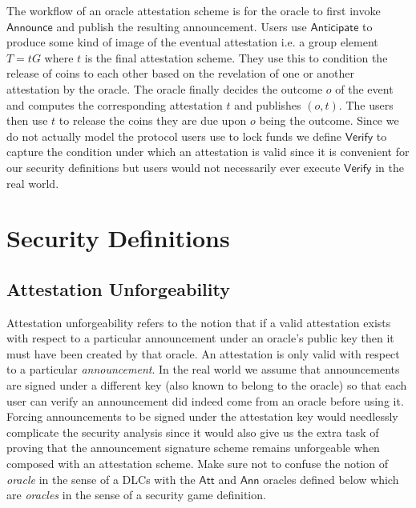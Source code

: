 \documentclass[runningheads]{llncs}
\newcommand{\Verify}{\mathsf{Verify}}
\newcommand{\Announce}{\mathsf{Announce}}
\newcommand{\AnnO}{\mathsf{Ann}}
\newcommand{\AttO}{\mathsf{Att}}
\newcommand{\Anticipate}{\mathsf{Anticipate}}
\newcommand{\att}{t}
\newcommand{\Att}{T}
\begin{document}
The workflow of an oracle attestation scheme is for the oracle to first invoke $\Announce$ and publish the resulting announcement.
Users use $\Anticipate$ to produce some kind of image of the eventual attestation i.e. a group element $\Att = \att{}G$ where $\att$ is the final attestation scheme.
They use this to condition the release of coins to each other based on the revelation of one or another attestation by the oracle.
The oracle finally decides the outcome $o$ of the event and computes the corresponding attestation $\att$ and publishes $(o,\att)$.
The users then use $\att$ to release the coins they are due upon $o$ being the outcome.
Since we do not actually model the protocol users use to lock funds we define $\Verify$ to capture the condition under which an attestation is valid since it is convenient for our security definitions but users would not necessarily ever execute $\Verify$ in the real world.

\section{Security Definitions}

\subsection{Attestation Unforgeability}

Attestation unforgeability refers to the notion that if a valid attestation exists with respect to a particular announcement under an oracle's public key then it must have been created by that oracle.
An attestation is only valid with respect to a particular \emph{announcement}.
In the real world we assume that announcements are signed under a different key (also known to belong to the oracle) so that each user can verify an announcement did indeed come from an oracle before using it.
Forcing announcements to be signed under the attestation key would needlessly complicate the security analysis since it would also give us the extra task of proving that the announcement signature scheme remains unforgeable when composed with an attestation scheme.
Make sure not to confuse the notion of \emph{oracle} in the sense of a DLCs with the $\AttO$ and $\AnnO$ oracles defined below which are \emph{oracles} in the sense of a security game definition.
\end{document}
